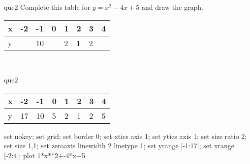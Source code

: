 \documentclass[13.5pt, varwidth=true]{beamer}
\begin{document}
\begin{frame}[shrink=19,fragile]
	\begin{beamercolorbox}[rounded=true, left, shadow=true,wd=14.8cm]{que2}
		 Complete this table for $y = x^{2} - 4x + 5$ and draw the graph. \\[0.3cm] \renewcommand{\arraystretch}{1.2}\begin{tabular}{|C|C|C|C|C|C|C|C|} \hline x & -2 & -1 & 0 & 1 & 2 & 3 & 4 \\ \hline y &  & 10 &  & 2 & 1 & 2 & \\ \hline \end{tabular}\\[0.3cm]
	\end{beamercolorbox}
\end{frame}
\begin{frame}[shrink=19,fragile]
	\begin{beamercolorbox}[rounded=true, left, shadow=true,wd=14.8cm]{que2}
		\renewcommand{\arraystretch}{1.2}\begin{tabular}{|C|C|C|C|C|C|C|C|} \hline x & -2 & -1 & 0 & 1 & 2 & 3 & 4 \\ \hline y & 17 & 10 & 5 & 2 & 1 & 2 & 5\\ \hline \end{tabular}\begin{gnuplot}[terminal=pdf] set nokey; set grid; set border 0; set xtics axis 1; set ytics axis 1; set size ratio 2; set size 1,1; set zeroaxis linewidth 2 linetype 1; set yrange [-1:17]; set xrange [-2:4]; plot 1*x**2+-4*x+5 \end{gnuplot}
	\end{beamercolorbox}
\end{frame}
\end{document}
